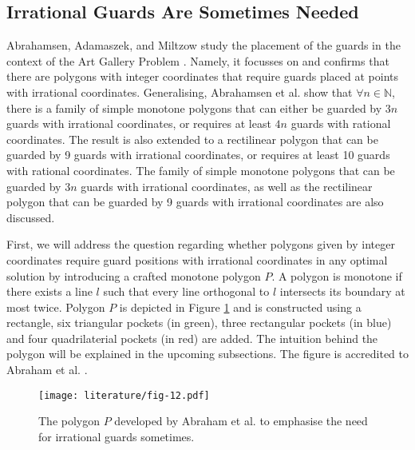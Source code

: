 \subsection{Irrational Guards Are Sometimes Needed}
Abrahamsen, Adamaszek, and Miltzow \cite{abrahamsen2021art} study the placement of the guards in the context of the Art Gallery Problem \cite{o1987art}. Namely, it focusses on and confirms that there are polygons with integer coordinates that require guards placed at points with irrational coordinates. Generalising, Abrahamsen et al. show that $\forall n \in \mathbb N$, there is a family of simple monotone polygons that can either be guarded by $3n$ guards with irrational coordinates, or requires at least $4n$ guards with rational coordinates. The result is also extended to a rectilinear polygon that can be guarded by 9 guards with irrational coordinates, or requires at least 10 guards with rational coordinates. The family of simple monotone polygons that can be guarded by $3n$ guards with irrational coordinates, as well as the rectilinear polygon that can be guarded by 9 guards with irrational coordinates are also discussed.



First, we will address the question regarding whether polygons given by integer coordinates require guard positions with irrational coordinates in any optimal solution by introducing a crafted monotone polygon $P$. A polygon is monotone if there exists a line $l$ such that every line orthogonal to $l$ intersects its boundary at most twice. Polygon $P$ is depicted in Figure \ref{fig:p} and is constructed using a rectangle, six triangular pockets (in green), three rectangular pockets (in blue) and four quadrilaterial pockets (in red) are added. The intuition behind the polygon will be explained in the upcoming subsections. The figure is accredited to Abraham et al. \cite{1057165}.

\begin{figure}[h!]
    \centering
    \texttt{[image: literature/fig-12.pdf]}
    \caption{The polygon $P$ developed by Abraham et al. \cite{1057165} to emphasise the need for irrational guards sometimes.}
    \label{fig:p}
\end{figure}

